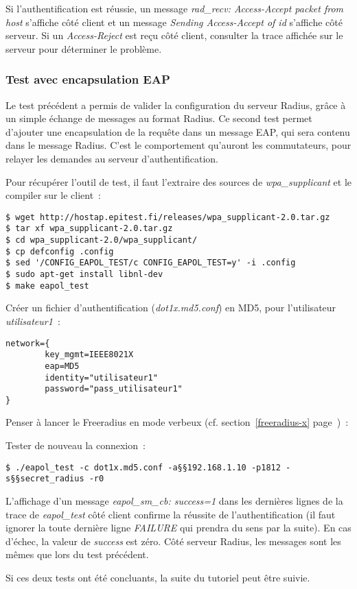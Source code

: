 Si l'authentification est réussie, un message \og\emph{rad\_recv: Access-Accept packet from host}\fg{} s'affiche côté client et un message \og\emph{Sending Access-Accept of id}\fg{} s'affiche côté serveur. Si un \emph{Access-Reject} est reçu côté client, consulter la trace affichée sur le serveur pour déterminer le problème.

\subsubsection{Test avec encapsulation EAP}

Le test précédent a permis de valider la configuration du serveur Radius, grâce à un simple échange de messages au format Radius. Ce second test permet d'ajouter une encapsulation de la requête dans un message EAP, qui sera contenu dans le message Radius. C'est le comportement qu'auront les commutateurs, pour relayer les demandes au serveur d'authentification.

\label{eapol-test}
Pour récupérer l'outil de test, il faut l'extraire des sources de \emph{wpa\_supplicant} et le compiler sur le client~:

\begin{lstlisting}
$ wget http://hostap.epitest.fi/releases/wpa_supplicant-2.0.tar.gz
$ tar xf wpa_supplicant-2.0.tar.gz
$ cd wpa_supplicant-2.0/wpa_supplicant/
$ cp defconfig .config
$ sed '/CONFIG_EAPOL_TEST/c CONFIG_EAPOL_TEST=y' -i .config
$ sudo apt-get install libnl-dev
$ make eapol_test
\end{lstlisting}

\label{auth-md5}
Créer un fichier d'authentification (\emph{dot1x.md5.conf}) en MD5, pour l'utilisateur \emph{utilisateur1}~:

\begin{lstlisting}
network={
        key_mgmt=IEEE8021X
        eap=MD5
        identity="utilisateur1"
        password="pass_utilisateur1"
}
\end{lstlisting}

Penser à lancer le Freeradius en mode verbeux (cf. section~\ref{freeradius-x} page~\pageref{freeradius-x})~:

Tester de nouveau la connexion~:

\begin{lstlisting}
$ ./eapol_test -c dot1x.md5.conf -a§§192.168.1.10 -p1812 -s§§secret_radius -r0
\end{lstlisting} 

L'affichage d'un message \og{}\emph{eapol\_sm\_cb: success=1}\fg{} dans les dernières lignes de la trace de \emph{eapol\_test} côté client confirme la réussite de l'authentification (il faut ignorer la toute dernière ligne \emph{FAILURE} qui prendra du sens par la suite). En cas d'échec, la valeur de \emph{success} est zéro. Côté serveur Radius, les messages sont les mêmes que lors du test précédent.

Si ces deux tests ont été concluants, la suite du tutoriel peut être suivie.
